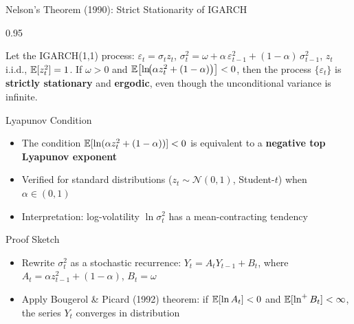 \documentclass[9pt, aspectratio=169, t]{beamer}
\begin{document}
\begin{frame}{Nelson's Theorem (1990): Strict Stationarity of IGARCH}
    \begin{cminipage}{0.95\textwidth}
        \vspace{-2mm}
        {\scriptsize
        \begin{thm}[Nelson, 1990]
            Let the IGARCH(1,1) process:
            $\varepsilon_t = \sigma_t z_t$, \; $\sigma_t^2 = \omega + \alpha\,\varepsilon_{t-1}^2 + (1 - \alpha)\,\sigma_{t-1}^2$, \; $z_t$ i.i.d., $\mathbb{E}[z_t^2] = 1$.
            If $\omega > 0$ and $\mathbb{E}\bigl[\ln\!\bigl(\alpha z_t^2 + (1 - \alpha)\bigr)\bigr] < 0$, then the process $\{\varepsilon_t\}$ is \textbf{strictly stationary} and \textbf{ergodic}, even though the unconditional variance is infinite.
        \end{thm}
        \vspace{-1mm}
        \begin{block}{Lyapunov Condition}
            \begin{itemize}\setlength{\itemsep}{0pt}
                \item The condition $\mathbb{E}[\ln(\alpha z_t^2 + (1-\alpha))] < 0$ is equivalent to a \textbf{negative top Lyapunov exponent}
                \item Verified for standard distributions ($z_t \sim \mathcal{N}(0,1)$, Student-$t$) when $\alpha \in (0,1)$
                \item Interpretation: log-volatility $\ln \sigma_t^2$ has a mean-contracting tendency
            \end{itemize}
        \end{block}
        \vspace{-1mm}
        \begin{block}{Proof Sketch}
            \begin{itemize}\setlength{\itemsep}{0pt}
                \item Rewrite $\sigma_t^2$ as a stochastic recurrence: $Y_t = A_t Y_{t-1} + B_t$, where $A_t = \alpha z_{t-1}^2 + (1-\alpha)$, $B_t = \omega$
                \item Apply Bougerol \& Picard (1992) theorem: if $\mathbb{E}[\ln A_t] < 0$ and $\mathbb{E}[\ln^+ B_t] < \infty$, the series $Y_t$ converges in distribution
            \end{itemize}
        \end{block}
        }
    \end{cminipage}
\end{frame}
\end{document}
